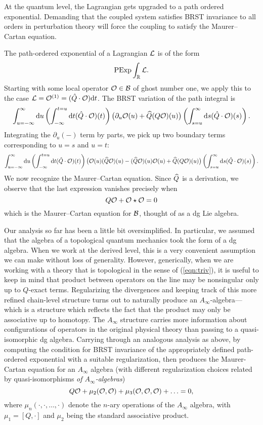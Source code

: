 \documentclass[11pt]{amsart}
\def\brian#1{{\textcolor{blue!65!red}{BRW: {#1}}}}
\def\natalie#1{{\textcolor{green!65!black}{NMP: {#1}}}}
\begin{document}
At the quantum level, the Lagrangian gets upgraded to a path ordered exponential. Demanding that the coupled system satisfies BRST invariance to all orders in perturbation theory will force the coupling to satisfy the Maurer--Cartan equation.

The path-ordered exponential of a Lagrangian $\cL$ is of the form %
\[
\text{PExp} \int_\RR \cL .
\]
Starting with some local operator $\cO \in \cB$ of ghost number one, we apply this to the case $\cL = \cO^{(1)} = (\hat{Q} \cdot \cO) \d t$.
The BRST variation of the path integral is
\[
\int_{u=-\infty}^\infty \d u \left( \int_{-\infty}^{t = u} \d t (\hat{Q} \cdot \cO) (t) \right) \big(\partial_u \cO(u) + \Hat{Q} (Q \cO)(u) \big) \left( \int_{s=u}^{\infty} \d s (\hat{Q} \cdot \cO) (s) \right) .
\]
Integrating the $\partial_u(-)$ term by parts, we pick up two boundary terms corresponding to $u=s$ and $u=t$:
\[
\int_{u=-\infty}^\infty \d u \left( \int_{-\infty}^{t = u} \d t (\hat{Q} \cdot \cO) (t) \right) \big(\cO (u) (\Hat{Q}\cO) (u) - (\Hat{Q}\cO) (u) \cO (u) + \Hat{Q} (Q \cO)(u) \big) \left( \int_{s=u}^{\infty} \d s (\hat{Q} \cdot \cO) (s) \right) .
\]
We now recognize the Maurer--Cartan equation. 
Since $\Hat{Q}$ is a derivation, we observe that the last expression vanishes precisely when
\[
Q \cO + \cO \star \cO = 0 
\]
which is the Maurer--Cartan equation for $\cB$, thought of as a dg Lie algebra. 

Our analysis so far has been a little bit oversimplified. In particular, we assumed that the algebra of a topological quantum mechanics took the form of a dg algebra. 
When we work at the derived level, this is a very convenient assumption we can make without loss of generality. 
However, generically, when we are working with a theory that is topological in the sense of (\ref{eqn:triv}), it is useful to keep in mind that product between operators on the line may be nonsingular only up to $Q$-exact terms. 
Regularizing the divergences and keeping track of this more refined chain-level structure turns out to naturally produce an $A_\infty$-algebra---which is a structure which reflects the fact that the product may only be associative up to homotopy. 
The $A_\infty$ structure carries more information about configurations of operators in the original physical theory than passing to a quasi-isomorphic dg algebra. 
Carrying through an analogous analysis as above, by computing the condition for BRST invariance of the appropriately defined path-ordered exponential with a suitable regularization, then produces the Maurer-Cartan equation for an $A_{\infty}$ algebra (with different regularization choices related by quasi-isomorphisms \textit{of $A_{\infty}$-algebras})
\[
Q \cO + \mu_2(\cO, \cO) + \mu_3(\cO, \cO, \cO) + \ldots = 0,
\]
where $\mu_n(\cdot, \cdot, \ldots, \cdot)$ denote the $n$-ary operations of the $A_{\infty}$ algebra, with $\mu_1 = [Q, \cdot]$ and $\mu_2$ being the standard associative product.  
\end{document}
